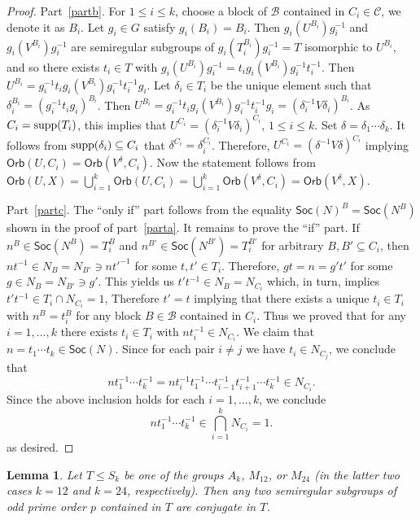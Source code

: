 \documentclass[11pt]{amsart}
\numberwithin{equation}{section}
\newtheorem{lem}[thrm]{Lemma}
\theoremstyle{definition}
\newcounter{case}
\def\soc{{\mathsf{Soc}}}
\def\supp{{\rm supp}}
\begin{document}
\begin{proof}
		Part~\eqref{partb}. For $1\le i\le k$, choose a block  of ${\mathcal  B}$ contained in $C_i\in{\mathcal  C}$, we denote it as $B_i$. Let $g_i\in G$ satisfy $g_i(B_i) = B_i$. Then $g_i(U^{B_i})g_i^{-1}$ and $g_i(V^{B_i})g_i^{-1}$ are semiregular subgroups of $g_i(T_i^{B_i})g_i^{-1} = T$ isomorphic to $U^{B_i}$, and so there exists $t_i\in T$ with $g_i(U^{B_i})g_i^{-1} = t_ig_i(V^{B_i})g_i^{-1}t_i^{-1}$.  Then $U^{B_i} = g_i^{-1}t_ig_i(V^{B_i})g_i^{-1}t_i^{-1}g_i$.  Let $\delta_i\in T_i$ be the unique element such that $\delta_i^{B_i} =  (g_i^{-1}t_ig_i)^{B_i}$.
		Then $U^{B_i} = g_i^{-1}t_ig_i(V^{B_i})g_i^{-1}t_i^{-1}g_i = (\delta_i^{-1} V\delta_i)^{B_i}$. As $C_i = \supp(T_i)$, this implies that $U^{C_i} = (\delta_i^{-1} V\delta_i)^{C_i}$, $1\le i\le k$.  Set $\delta = \delta_1 \cdots \delta_k$. It follows from $\supp(\delta_i)\subseteq C_i$ that $\delta^{C_i}=\delta_i^{C_i}$. Therefore, $U^{C_i} = (\delta^{-1} V\delta)^{C_i}$ implying $\mathsf{Orb}(U,C_i) = \mathsf{Orb}(V^\delta,C_i)$. Now the statement follows from $\mathsf{Orb}(U,X) =\bigcup_{i=1}^k \mathsf{Orb}(U,C_i)=\bigcup_{i=1}^k \mathsf{Orb}(V^\delta,C_i)=\mathsf{Orb}(V^\delta,X) $.
		
		Part~\eqref{partc}. The ``only if'' part follows from the equality $\soc(N)^{B} = \soc(N^{B})$ shown in the proof of part~\eqref{parta}. It remains to prove the ``if'' part. If $n^{B}\in \soc({N^{B}})=T_i^{B}$ and 
		$n^{B'}\in \soc({N^{B'}})=T_i^{B'}$
		 for arbitrary $B,B'\subseteq C_i$, then $nt^{-1}\in N_{B}=N_{B'}\ni n{t'}^{-1}$ for some $t,t'\in T_i$. Therefore, $gt=n=g't'$ for some $g\in N_{B}= N_{B'}\ni g'$. This yields us $t't^{-1}\in N_B = N_{C_i}$ which,  in turn,  implies $t't^{-1}\in T_i\cap N_{C_i}=1$, Therefore $t'=t$ implying that there exists a unique $t_i \in T_i$ with $n^B=t_i^B$ for any block $B\in\mathcal{B}$ contained in $C_i$. Thus we proved that for any $i=1,...,k$ there exists $t_i\in T_i$ with $nt_i^{-1}\in N_{C_i}$. We claim that $n=t_1\cdots t_k\in\soc(N)$.  Since for each pair $i\neq j$ we have $t_i\in N_{C_j}$, we conclude that  
		 $$nt_1^{-1}\cdots t_k^{-1} = nt_i^{-1} t_1^{-1}\cdots t_{i-1}^{-1} t_{i+1}^{-1}\cdots t_k^{-1} \in N_{C_i}. $$
		 Since the above inclusion holds for each $i=1,...,k$, we conclude                 
		$$nt_1^{-1}\cdots t_k^{-1} \in \bigcap_{i=1}^k N_{C_i} =  1.
		$$
		as desired.
		
	\end{proof}
	
	\begin{lem}\label{altbottom1}
		Let $T \le S_k$ be one of the groups $A_k$, $M_{12}$, or $M_{24}$ 
		(in the latter two cases $k = 12$ and $k = 24$, respectively). 
		Then any two semiregular subgroups of odd prime order $p$ contained in $T$ are conjugate in $T$.
	\end{lem}
	
\end{document}
